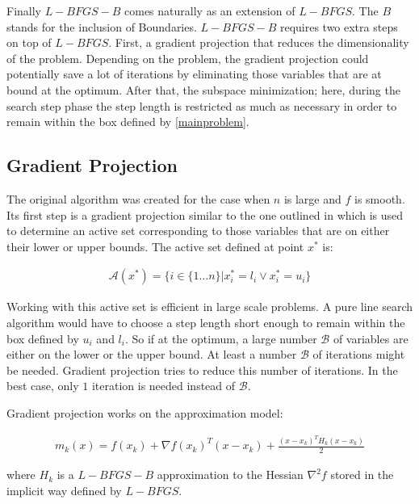 Finally $L-BFGS-B$ comes naturally as an extension of $L-BFGS$. The $B$ stands for the inclusion of Boundaries.  $L-BFGS-B$ requires two extra steps on top of $L-BFGS$. First, a gradient projection that reduces the dimensionality of the problem. Depending on the problem, the gradient projection could potentially save a lot of iterations by eliminating those variables that are at bound at the optimum. After that, the subspace minimization; here, during the search step phase the step length is restricted as much as necessary in order to remain within the box defined by \ref{mainproblem}.

\subsection{Gradient Projection}
The original algorithm was created for the case when $n$ is large and $f$ is smooth. Its first step is a gradient projection similar to the one outlined in \citep{gradproj1, gradproj2} which is used to determine an active set corresponding to those variables that are on either their lower or upper bounds. The active set defined at point $x^*$ is:

\begin{equation}
  \begin{aligned}
    \mathcal{A}(x^*) = \{ i \in \{1 \ldots n\} |  x^*_i = l_i \vee  x^*_i = u_i\}
  \end{aligned}
\end{equation}

Working with this active set is efficient in large scale problems. A pure line search algorithm would have to choose a step length short enough to remain within the box defined by $u_i$ and $l_i$. So if at the optimum, a large number $\mathcal{B}$ of variables are either on the lower or the upper bound. At least a number $\mathcal{B}$ of iterations might be needed. Gradient projection tries to reduce this number of iterations. In the best case, only $1$ iteration is needed instead of $\mathcal{B}$.

Gradient projection works on the approximation model:

\begin{equation} \label{themodel}
  \begin{aligned}
    m_k(x) = f(x_k) + \nabla f(x_k)^T ( x - x_k) + \frac{(x - x_k)^T H_k (x - x_k) }{2}
  \end{aligned}
\end{equation}

where $H_k$ is a $L-BFGS-B$ approximation to the Hessian $\nabla^2 f$ stored in the implicit way defined by $L-BFGS$.

